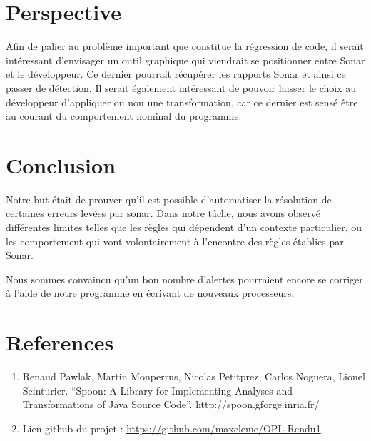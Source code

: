 \documentclass[a4paper]{article}
\begin{document}
\section{Perspective}
\par Afin de palier au problème important que constitue la régression de code, il serait intéressant d'envisager un outil graphique qui viendrait se positionner entre Sonar et le développeur. Ce dernier pourrait récupérer les rapports Sonar et ainsi ce passer de détection. Il serait également intéressant de pouvoir laisser le choix au développeur d'appliquer ou non une transformation, car ce dernier est sensé être au courant du comportement nominal du programme.

\section{Conclusion}
\par Notre but était de prouver qu'il est possible d'automatiser la résolution de certaines erreurs levées par sonar. Dans notre tâche, nous avons observé différentes limites telles que les règles qui dépendent d'un contexte particulier, ou les comportement qui vont volontairement à l'encontre des règles établies par Sonar.
\par Nous sommes convaincu qu'un bon nombre d'alertes pourraient encore se corriger à l'aide de notre programme en écrivant de nouveaux processeurs.


\section{References}
\begin{enumerate}
	\item  Renaud Pawlak, Martin Monperrus, Nicolas Petitprez, Carlos Noguera, Lionel Seinturier. “Spoon: A Library for Implementing Analyses and Transformations of Java Source Code”. http://spoon.gforge.inria.fr/
	\item Lien github du projet : \url{https://github.com/maxcleme/OPL-Rendu1}
\end{enumerate}	
\end{document}
